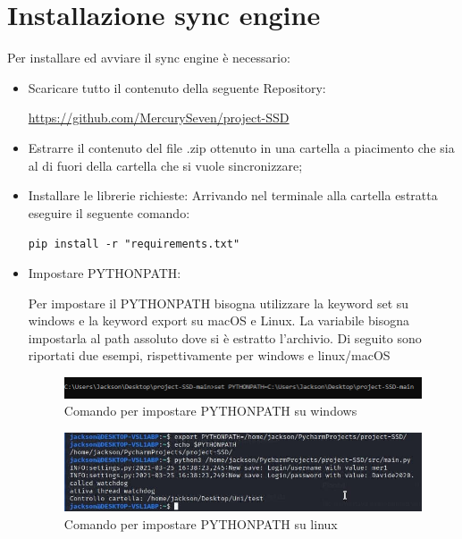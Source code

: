 \section{Installazione sync engine}
Per installare ed avviare il sync engine è necessario:
\begin{itemize}
	\item Scaricare tutto il contenuto della seguente Repository:
	
\centerline{\url{https://github.com/MercurySeven/project-SSD}}

	\item Estrarre il contenuto del file .zip ottenuto in una cartella a piacimento che sia al di fuori della cartella che si vuole sincronizzare;
	
	\item Installare le librerie richieste:
	Arrivando nel terminale alla cartella estratta eseguire il seguente comando:
	
	\centerline{\texttt{pip install -r "requirements.txt"}}
	
\item Impostare PYTHONPATH:

Per impostare il PYTHONPATH bisogna utilizzare la keyword set su windows e la keyword export su macOS e Linux. La variabile bisogna impostarla al path assoluto dove si è estratto l'archivio.
Di seguito sono riportati due esempi, rispettivamente per windows e linux/macOS
\begin{figure}[H]
    \centering
    \includegraphics[scale = 0.65]{components/img/Windows-istruzione-1.png}
    \caption{Comando per impostare PYTHONPATH su windows}
    \label{fig:comando per impostare PYTHONPATH su windows}
\end{figure}
\begin{figure}[H]
    \centering
    \includegraphics[scale = 0.65]{components/img/linux-istruzione-1.jpg}
    \caption{ Comando per impostare PYTHONPATH su linux}
    \label{fig:comando per impostare PYTHONPATH su windows}
\end{figure}


\end{itemize}
